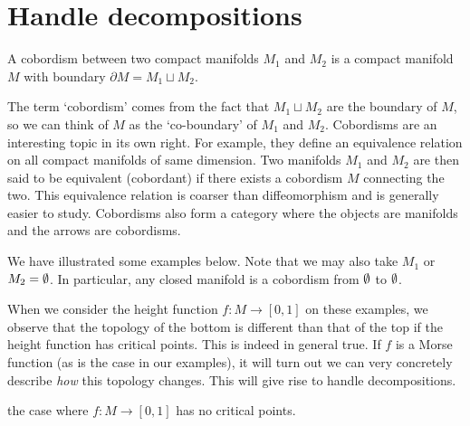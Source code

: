 \section{Handle decompositions}

\begin{definition}
A cobordism between two compact manifolds $M_1$ and $M_2$ is a compact manifold $M$  with boundary $\partial M = M_1 \sqcup M_2$.
\end{definition}


The term `cobordism' comes from the fact that $M_1 \sqcup M_2$ are the boundary of $M$, so we can think of $M$ as the `co-boundary' of $M_1$ and $M_2$.
Cobordisms are an interesting topic in its own right.
For example, they define an equivalence relation on all compact manifolds of same dimension. Two manifolds $ M_1$ and $M_2$ are then said to be equivalent (cobordant) if there exists a cobordism $M$ connecting the two.
This equivalence relation is coarser than diffeomorphism and is generally easier to study.
Cobordisms also form a category where the objects are manifolds and the arrows are cobordisms.

We have illustrated some examples below.
Note that we may also take $M_1$ or $M_2 = \emptyset$.
In particular, any closed manifold is a cobordism from $\emptyset$ to $\emptyset$.
\begin{figure}[H]
    \centering
\end{figure}

When we consider the height function $f: M \to  [0, 1]$ on these examples,
we observe that the topology of the bottom is different than that of the top if the height function has critical points.
This is indeed in general true.
If $f$ is a Morse function (as is the case in our examples), it will turn out we can very concretely describe \emph{how} this topology changes.
This will give rise to handle decompositions.

 the case where $f: M \to [0, 1]$ has no critical points. 


